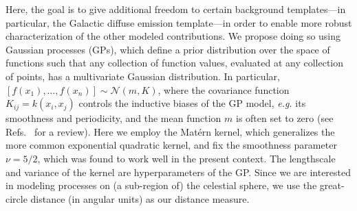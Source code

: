 \documentclass[]{article}
\begin{document}
Here, the goal is to give additional freedom to certain background templates---in particular, the Galactic diffuse emission template---in order to enable more robust characterization of the other modeled contributions. We propose doing so using Gaussian processes (GPs), which define a prior distribution over the space of functions such that any collection of function values, evaluated at any collection of points, has a multivariate Gaussian distribution. In particular, $\left[f\left(x_{1}\right), \ldots, f\left(x_{n}\right)\right] \sim \mathcal{N}(m, K)$,
%
%
%
where the covariance function $K_{i j}=k\left(x_{i}, x_{j}\right)$ controls the inductive biases of the GP model, \emph{e.g.} its smoothness and periodicity, and the mean function $m$ is often set to zero (see Refs.~\cite{10.5555/1162254,wilson2014covariance} for a review). Here we employ the Matérn kernel, which generalizes the more common exponential quadratic kernel, and fix the smoothness parameter $\nu = 5/2$, which was found to work well in the present context. The lengthscale and variance of the kernel are hyperparameters of the GP. Since we are interested in modeling processes on (a sub-region of) the celestial sphere, we use the great-circle distance (in angular units) as our distance measure.
\end{document}
